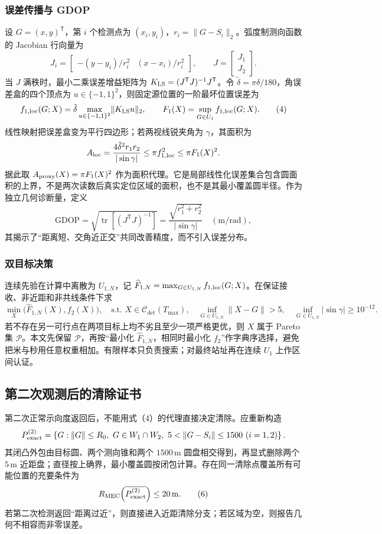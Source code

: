 \subsubsection{误差传播与 GDOP}
设 $G=(x,y)^{\mathsf T}$，第 $i$ 个检测点为 $(x_i,y_i)$，$r_i=\lVert G-S_i\rVert_2$。弧度制测向函数的 Jacobian 行向量为
\[
J_i=\begin{bmatrix}-(y-y_i)/r_i^2 & (x-x_i)/r_i^2\end{bmatrix},\qquad
J=\begin{bmatrix}J_1\\J_2\end{bmatrix}.
\]
当 $J$ 满秩时，最小二乘误差增益矩阵为 $K_{\rm LS}=(J^{\mathsf T}J)^{-1}J^{\mathsf T}$。令 $\tilde\delta=\pi\delta/180$，角误差盒的四个顶点为 $u\in\{-1,1\}^2$，则固定源位置的一阶最坏位置误差为
\[
f_{1,\rm loc}(G;X)=\tilde\delta
\max_{u\in\{-1,1\}^2}\lVert K_{\rm LS}u\rVert_2,\qquad
F_1(X)=\sup_{G\in U_1}f_{1,\rm loc}(G;X).                  \tag{4}
\]
线性映射把误差盒变为平行四边形；若两视线锐夹角为 $\gamma$，其面积为
\[
A_{\rm loc}=\frac{4\tilde\delta^2r_1r_2}{|\sin\gamma|}
\le\pi f_{1,\rm loc}^2\le\pi F_1(X)^2.
\]
据此取 $A_{\rm proxy}(X)=\pi F_1(X)^2$ 作为面积代理。它是局部线性化误差集合包含圆面积的上界，不是两次读数后真实定位区域的面积，也不是其最小覆盖圆半径。作为独立几何诊断量，定义
\[
\mathrm{GDOP}=\sqrt{\operatorname{tr}[(J^{\mathsf T}J)^{-1}]}
=\frac{\sqrt{r_1^2+r_2^2}}{|\sin\gamma|}\quad(\mathrm{m/rad}),
\]
其揭示了“距离短、交角近正交”共同改善精度，而不引入误差分布\cite{bishop2010}。

\subsubsection{双目标决策}
连续先验在计算中离散为 $U_{1,N}$，记 $\widehat F_{1,N}=\max_{G\in U_{1,N}}f_{1,\rm loc}(G;X)$。在保证接收、非近距和非共线条件下求
\[
\min_X\bigl(\widehat F_{1,N}(X),f_2(X)\bigr),\quad
\text{s.t. }X\in\mathcal C_{\det}(T_{\max}),\quad
\inf_{G\in U_{1,N}}\lVert X-G\rVert>5,\quad
\inf_{G\in U_{1,N}}|\sin\gamma|\ge10^{-12}.              \tag{5}
\]
若不存在另一可行点在两项目标上均不劣且至少一项严格更优，则 $X$ 属于 Pareto 集 $\mathcal P$。本文先保留 $\mathcal P$，再按“最小化 $\widehat F_{1,N}$，相同时最小化 $f_2$”作字典序选择，避免把米与秒用任意权重相加。有限样本只负责搜索；对最终站址再在连续 $U_1$ 上作区间认证。

\subsection{第二次观测后的清除证书}
第二次正常示向度返回后，不能用式（4）的代理直接决定清除。应重新构造
\[
P_{\rm exact}^{(2)}=\left\{G:\lVert G\rVert\le R_0,
\ G\in W_1\cap W_2,
\ 5<\lVert G-S_i\rVert\le1500\ (i=1,2)\right\}.
\]
其闭凸外包由目标圆、两个测向锥和两个 $1500\,\mathrm m$ 圆盘相交得到，再显式删除两个 $5\,\mathrm m$ 近距盘；直径按上确界，最小覆盖圆按闭包计算。存在同一清除点覆盖所有可能位置的充要条件为
\[
R_{\rm MEC}\!\left(\overline{P_{\rm exact}^{(2)}}\right)\le20\,\mathrm m. \tag{6}
\]
若第二次检测返回“距离过近”，则直接进入近距清除分支；若区域为空，则报告几何不相容而非零误差。

